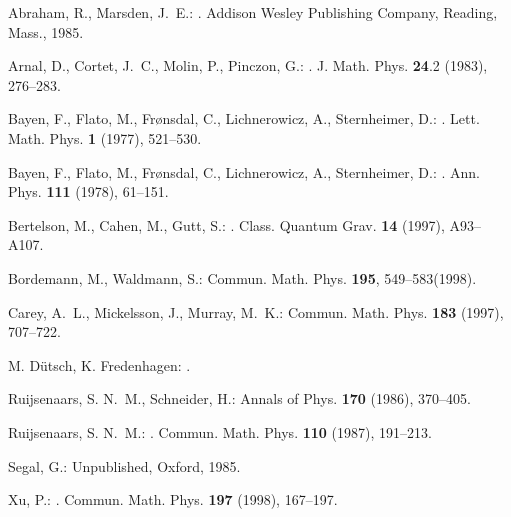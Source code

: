 \documentclass[a4paper,12pt]{article}
\begin{document}
\begin{thebibliography}{**}

{\sc Abraham, R., Marsden, J.~E.: }.
\newblock Addison Wesley Publishing Company, Reading, Mass., 1985.
 
{\sc Arnal, D., Cortet, J.~C., Molin, P., Pinczon, G.: }.
\newblock J. Math. Phys.  {\bf 24}.2 (1983), 276--283.
 
{\sc Bayen, F., Flato, M., Fr{{\o}}nsdal, C., Lichnerowicz, A., Sternheimer,
  D.: }.
\newblock Lett. Math. Phys.  {\bf 1} (1977), 521--530.

{\sc Bayen, F., Flato, M., Fr{{\o}}nsdal, C., Lichnerowicz, A., Sternheimer,
  D.: }.
\newblock Ann. Phys.  {\bf 111} (1978), 61--151.

{\sc Bertelson, M., Cahen, M., Gutt, S.: }.
\newblock Class. Quantum Grav.  {\bf 14} (1997), A93--A107.

{\sc Bordemann, M., Waldmann, S.: }
\newblock Commun. Math. Phys. {\bf 195}, 549--583(1998).
 
{\sc Carey, A.~L., Mickelsson, J., Murray, M.~K.: }
\newblock Commun. Math. Phys.  {\bf 183} (1997), 707--722.

  {\sc M. D\"utsch, K. Fredenhagen:}
  .
 
{\sc Ruijsenaars, S. N.~M., Schneider, H.: }
\newblock Annals of Phys.  {\bf 170} (1986), 370--405.
 
{\sc Ruijsenaars, S. N.~M.: }.
\newblock Commun. Math. Phys.  {\bf 110} (1987), 191--213.

{\sc Segal, G.: }
\newblock Unpublished, Oxford, 1985.
 
{\sc Xu, P.: }.
\newblock Commun. Math. Phys.  {\bf 197} (1998), 167--197.
 
\end{thebibliography}  
\end{document}
